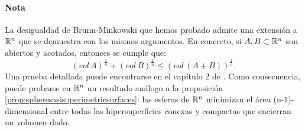 \paragraph{Nota}{La desigualdad de Brunn-Minkowski que hemos probado admite una extensión a $\mathbb{R}^n$ que se demuestra con los mismos argumentos. En concreto, si $A,B \subset \mathbb{R}^n$ son abiertos y acotados, entonces se cumple que:
\begin{equation*}
    (vol \, A)^{\frac{1}{n}} + (vol \, B)^{\frac{1}{n}} \leq (vol \, (A+B))^{\frac{1}{n}}.
\end{equation*}
%
Una prueba detallada puede encontrarse en el capítulo 2 de \cite{geometricinequalities}.
Como consecuencia, puede probarse en $\mathbb{R}^n$ un resultado análogo a la proposición \ref{prop:spheresasisoperimetricsurfaces}: las esferas de $\mathbb{R}^n$ minimizan el área (n-$1$)-dimensional entre todas las hipersuperficies conexas y compactas que encierran un volumen dado.}
